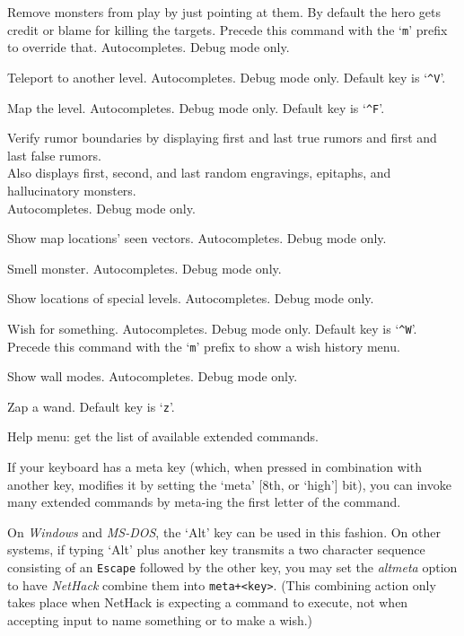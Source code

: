 \documentclass[titlepage]{article}
\begin{document}
\begin{description}[font=\mdseries\ttfamily]
Remove monsters from play by just pointing at them.
By default the hero gets credit or blame for killing the targets.
Precede this command with the `\texttt{m}' prefix to override that.
Autocompletes.
Debug mode only.
\item[\#wizlevelport]
Teleport to another level.
Autocompletes.
Debug mode only.
Default key is `\texttt{\textasciicircum V}'.
\item[\#wizmap]
Map the level.
Autocompletes.
Debug mode only.
Default key is `\texttt{\textasciicircum F}'.
\item[\#wizrumorcheck]
Verify rumor boundaries by displaying first and last true rumors and
first and last false rumors.\\
Also displays first, second, and last random engravings, epitaphs,
and hallucinatory monsters.\\
Autocompletes.
Debug mode only.
\item[\#wizseenv]
Show map locations' seen vectors.
Autocompletes.
Debug mode only.
\item[\#wizsmell]
Smell monster.
Autocompletes.
Debug mode only.
\item[\#wizwhere]
Show locations of special levels.
Autocompletes.
Debug mode only.
\item[\#wizwish]
Wish for something.
Autocompletes.
Debug mode only.
Default key is `\texttt{\textasciicircum W}'.
Precede this command with the `\texttt{m}' prefix to show a wish history menu.
\item[\#wmode]
Show wall modes.
Autocompletes.
Debug mode only.
\item[\#zap]
Zap a wand. Default key is `\texttt{z}'.
\item[\#?]
Help menu:  get the list of available extended commands.
\end{description}

\noindent If your keyboard has a meta key (which, when pressed in combination
with another key, modifies it by setting the `meta' [8th, or `high']
bit), you can invoke many extended commands by meta-ing the first
letter of the command.

On \textit{Windows} and \textit{MS-DOS},
the `Alt' key can be used in this fashion.
On other systems, if typing `Alt' plus another key transmits a
two character sequence consisting of an \texttt{Escape}
followed by the other key, you may set the \textit{altmeta}
option to have \textit{NetHack} combine them into \texttt{meta+<key>}.
(This combining action only takes place when NetHack is expecting a
command to execute, not when accepting input to name something or to
make a wish.)
\end{document}
